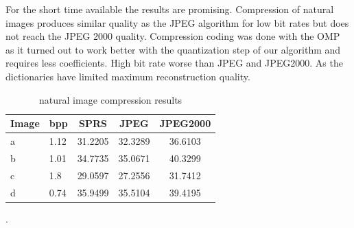 For the short time available the results are promising. Compression of
natural images produces similar quality as the JPEG algorithm
 for low bit rates but does not reach the JPEG 2000
quality. Compression coding was done with the OMP as it turned out to work
better with the quantization step of our algorithm and requires less
coefficients. High bit rate worse than JPEG and JPEG2000. As the
dictionaries have limited maximum reconstruction quality.

\begin{table}[h]
\centering

\begin{tabular}{| l l | c | c | c|}
\hline\hline
Image & bpp & SPRS & JPEG & JPEG2000 \\
\hline
a & 1.12 & 31.2205 & 32.3289 & 36.6103 \\
\hline
b & 1.01 & 34.7735 & 35.0671 & 40.3299 \\
\hline
c & 1.8  & 29.0597 & 27.2556 & 31.7412 \\
\hline
d & 0.74  & 35.9499 & 35.5104 & 39.4195 \\
\hline
\end{tabular}
\caption{natural image compression results}
\label{tab:compression1}.
\end{table} 


